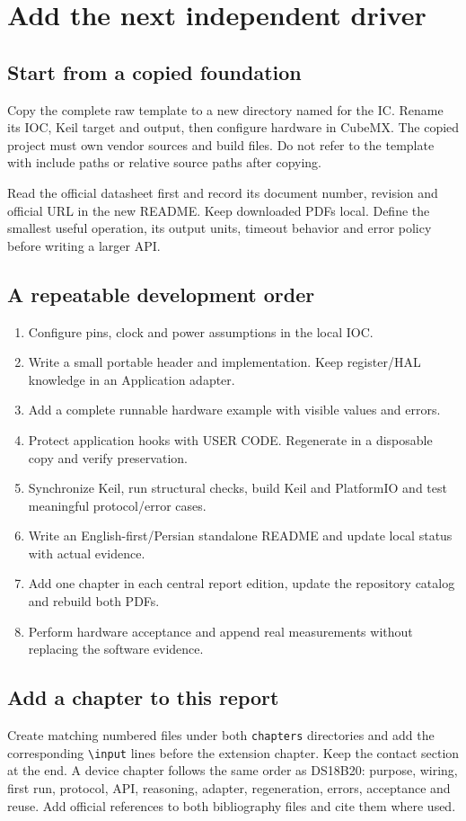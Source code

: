 \section{Add the next independent driver}
\subsection{Start from a copied foundation}
Copy the complete raw template to a new directory named for the IC. Rename its IOC, Keil target and output, then configure hardware in CubeMX. The copied project must own vendor sources and build files. Do not refer to the template with include paths or relative source paths after copying.

Read the official datasheet first and record its document number, revision and official URL in the new README. Keep downloaded PDFs local. Define the smallest useful operation, its output units, timeout behavior and error policy before writing a larger API.

\subsection{A repeatable development order}
\begin{enumerate}
\item Configure pins, clock and power assumptions in the local IOC.
\item Write a small portable header and implementation. Keep register/HAL knowledge in an Application adapter.
\item Add a complete runnable hardware example with visible values and errors.
\item Protect application hooks with USER CODE. Regenerate in a disposable copy and verify preservation.
\item Synchronize Keil, run structural checks, build Keil and PlatformIO and test meaningful protocol/error cases.
\item Write an English-first/Persian standalone README and update local status with actual evidence.
\item Add one chapter in each central report edition, update the repository catalog and rebuild both PDFs.
\item Perform hardware acceptance and append real measurements without replacing the software evidence.
\end{enumerate}

\subsection{Add a chapter to this report}
Create matching numbered files under both \texttt{chapters} directories and add the corresponding \texttt{\textbackslash input} lines before the extension chapter. Keep the contact section at the end. A device chapter follows the same order as DS18B20: purpose, wiring, first run, protocol, API, reasoning, adapter, regeneration, errors, acceptance and reuse. Add official references to both bibliography files and cite them where used.

